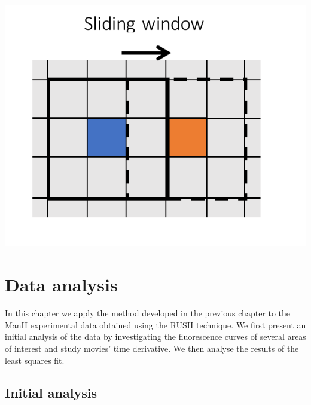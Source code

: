 \documentclass{Dissertate}
\let\origfigure\figure
\let\endorigfigure\endfigure
\renewenvironment{figure}[1][2] {
    \expandafter\origfigure\expandafter[H]
} {
    \endorigfigure
}
\begin{document}
\begin{figure}
\hypertarget{fig:slidingwindow}{%
\centering
\includegraphics{source/figures/pdf/slidingwindow.pdf}
\caption{Schematic overview of the sliding window technique. The solid
black line encompasses an area around its blue coloured central pixel
and the fit output is assigned to that pixel. We then move the window
(dashed black line) and perform the fit for the orange coloured
pixel.}\label{fig:slidingwindow}
}
\end{figure}


\hypertarget{data-analysis}{%
\chapter{Data analysis}\label{data-analysis}}

In this chapter we apply the method developed in the previous chapter to the ManII experimental data obtained using the RUSH technique. We first present an initial analysis of the data by investigating the fluorescence curves of several areas of interest and study movies' time derivative. We then analyse the results of the least squares fit.  

\hypertarget{initial-analysis}{%
\section{Initial analysis}\label{initial-analysis}}
\end{document}
